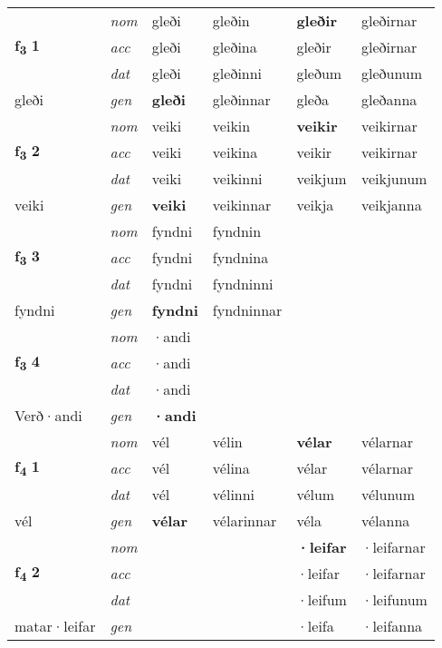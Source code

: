 \begin{longtable}[l]{X>{\footnotesize\itshape}XXXXX}
\multirow{3}{*}{{{\textbf{f{\textsubscript{3}}} \Large{\textbf{1}}}}} & nom & gleði & gleðin & \textbf{gleðir} & gleðirnar \\*
 & acc & gleði & gleðina & gleðir & gleðirnar \\*
 & dat & gleði & gleðinni & gleðum & gleðunum \\*
 {\footnotesize{gleði}} & gen & \textbf{gleði} & gleðinnar & gleða & gleðanna \\
\cmidrule{1-6}

\multirow{3}{*}{{{\textbf{f{\textsubscript{3}}} \Large{\textbf{2}}}}} & nom & veiki & veikin & \textbf{veikir} & veikirnar \\*
 & acc & veiki & veikina & veikir & veikirnar \\*
 & dat & veiki & veikinni & veikjum & veikjunum \\*
 {\footnotesize{veiki}} & gen & \textbf{veiki} & veikinnar & veikja & veikjanna \\
\cmidrule{1-6}

\multirow{3}{*}{{{\textbf{f{\textsubscript{3}}} \Large{\textbf{3}}}}} & nom & fyndni & fyndnin & \textbf{} &  \\*
 & acc & fyndni & fyndnina &  &  \\*
 & dat & fyndni & fyndninni &  &  \\*
 {\footnotesize{fyndni}} & gen & \textbf{fyndni} & fyndninnar &  &  \\
\cmidrule{1-6}

\multirow{3}{*}{{{\textbf{f{\textsubscript{3}}} \Large{\textbf{4}}}}} & nom & ·andi &  & \textbf{} &  \\*
 & acc & ·andi &  &  &  \\*
 & dat & ·andi &  &  &  \\*
 {\footnotesize{Verð\allowbreak ·andi}} & gen & \textbf{·andi} &  &  &  \\
\cmidrule{1-6}

\multirow{3}{*}{{{\textbf{f{\textsubscript{4}}} \Large{\textbf{1}}}}} & nom & vél & vélin & \textbf{vélar} & vélarnar \\*
 & acc & vél & vélina & vélar & vélarnar \\*
 & dat & vél & vélinni & vélum & vélunum \\*
 {\footnotesize{vél}} & gen & \textbf{vélar} & vélarinnar & véla & vélanna \\
\cmidrule{1-6}

\multirow{3}{*}{{{\textbf{f{\textsubscript{4}}} \Large{\textbf{2}}}}} & nom &  &  & \textbf{·leifar} & ·leifarnar \\*
 & acc &  &  & ·leifar & ·leifarnar \\*
 & dat &  &  & ·leifum & ·leifunum \\*
 {\footnotesize{matar\allowbreak ·leifar}} & gen & \textbf{} &  & ·leifa & ·leifanna \\
\cmidrule{1-6}


\end{longtable}
